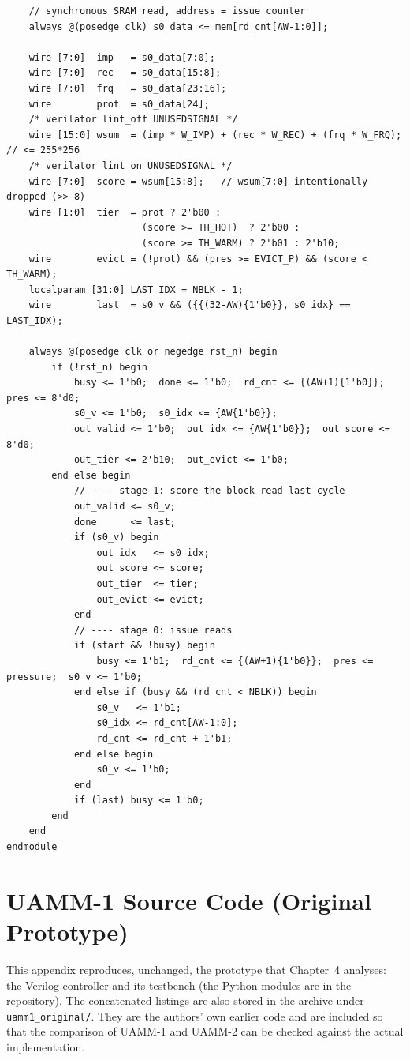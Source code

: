 \documentclass[12pt,a4paper]{report}
\begin{document}
\begin{lstlisting}
    // synchronous SRAM read, address = issue counter
    always @(posedge clk) s0_data <= mem[rd_cnt[AW-1:0]];

    wire [7:0]  imp   = s0_data[7:0];
    wire [7:0]  rec   = s0_data[15:8];
    wire [7:0]  frq   = s0_data[23:16];
    wire        prot  = s0_data[24];
    /* verilator lint_off UNUSEDSIGNAL */
    wire [15:0] wsum  = (imp * W_IMP) + (rec * W_REC) + (frq * W_FRQ);  // <= 255*256
    /* verilator lint_on UNUSEDSIGNAL */
    wire [7:0]  score = wsum[15:8];   // wsum[7:0] intentionally dropped (>> 8)
    wire [1:0]  tier  = prot ? 2'b00 :
                        (score >= TH_HOT)  ? 2'b00 :
                        (score >= TH_WARM) ? 2'b01 : 2'b10;
    wire        evict = (!prot) && (pres >= EVICT_P) && (score < TH_WARM);
    localparam [31:0] LAST_IDX = NBLK - 1;
    wire        last  = s0_v && ({{(32-AW){1'b0}}, s0_idx} == LAST_IDX);

    always @(posedge clk or negedge rst_n) begin
        if (!rst_n) begin
            busy <= 1'b0;  done <= 1'b0;  rd_cnt <= {(AW+1){1'b0}};  pres <= 8'd0;
            s0_v <= 1'b0;  s0_idx <= {AW{1'b0}};
            out_valid <= 1'b0;  out_idx <= {AW{1'b0}};  out_score <= 8'd0;
            out_tier <= 2'b10;  out_evict <= 1'b0;
        end else begin
            // ---- stage 1: score the block read last cycle
            out_valid <= s0_v;
            done      <= last;
            if (s0_v) begin
                out_idx   <= s0_idx;
                out_score <= score;
                out_tier  <= tier;
                out_evict <= evict;
            end
            // ---- stage 0: issue reads
            if (start && !busy) begin
                busy <= 1'b1;  rd_cnt <= {(AW+1){1'b0}};  pres <= pressure;  s0_v <= 1'b0;
            end else if (busy && (rd_cnt < NBLK)) begin
                s0_v   <= 1'b1;
                s0_idx <= rd_cnt[AW-1:0];
                rd_cnt <= rd_cnt + 1'b1;
            end else begin
                s0_v <= 1'b0;
            end
            if (last) busy <= 1'b0;
        end
    end
endmodule
\end{lstlisting}
\chapter{UAMM-1 Source Code (Original Prototype)}\label{app:uamm1src}
This appendix reproduces, unchanged, the prototype that Chapter~4 analyses: the Verilog controller and its testbench (the Python modules are in the repository). The concatenated listings are also stored in the archive under \texttt{uamm1\_\allowbreak{}\allowbreak{}original/\allowbreak{}}. They are the authors' own earlier code and are included so that the comparison of UAMM-1 and UAMM-2 can be checked against the actual implementation.
\end{document}

